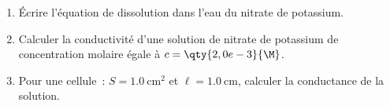 \begin{enumerate}
    \item Écrire l'équation de dissolution dans l'eau du nitrate de potassium.
    \item Calculer la conductivité d'une solution de nitrate de potassium de
          concentration molaire égale à $c=\qty{2,0e-3}{\M}$.
    \item Pour une cellule~: $S=\qty{1,0}{\square\cm}$ et $\ell=\qty{1,0}{\cm}$,
          calculer la conductance de la solution.
\end{enumerate}

